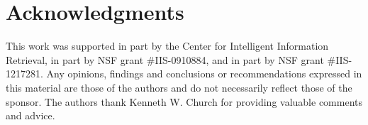 \documentclass[11pt,letterpaper]{article}
\begin{document}
\section*{Acknowledgments}
This work was supported in part by the Center for Intelligent Information Retrieval, in part by NSF grant \#IIS-0910884, and in part by NSF grant \#IIS-1217281. Any opinions, findings and conclusions or recommendations expressed in this material are those of the authors and do not necessarily reflect those of the sponsor. The authors thank Kenneth W. Church for providing valuable comments and advice. 



\end{document}
